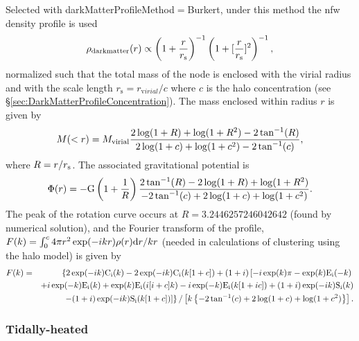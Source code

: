 Selected with {\normalfont \ttfamily darkMatterProfileMethod}$=${\normalfont \ttfamily Burkert}, under this method the \gls{nfw} density profile \citep{burkert_structure_1995} is used
\begin{equation}
  \rho_{\rm dark matter}(r) \propto \left(1+{r\over r_{\mathrm s}}\right)^{-1} \left(1+[{r\over r_{\mathrm s}}]^2\right)^{-1},
\end{equation}
normalized such that the total mass of the \gls{node} is enclosed with the virial radius and with the scale length $r_{\mathrm s} = r_{\mathrm virial}/c$ where $c$ is the halo concentration (see \S\ref{sec:DarkMatterProfileConcentration}). The mass enclosed within radius $r$ is given by
\begin{equation}
M(<r) = M_{\rm virial} {2 \log(1 + R) + \log(1 + R^2) -2 \tan^{-1}(R) \over 2 \log(1 + c) + \log(1 + c^2) -2 \tan^{-1}(c)},
\end{equation}
where $R=r/r_{\rm s}$. The associated gravitational potential is
\begin{equation}
\Phi(r) = -{\rm G} \left(1+{1 \over R}\right) { 2 \tan^{-1}(R) - 2 \log(1 + R) + \log(1 + R^2) \over -2 \tan^{-1}(c) + 2 \log(1 + c) + \log(1 + c^2) }.
\end{equation}
The peak of the rotation curve occurs at $R=3.2446257246042642$ (found by numerical solution), and the Fourier transform of the profile, $F(k) = \int_0^c 4 \pi r^2 \exp(-i k r) \rho(r) {\rm d} r / k r$ (needed in calculations of clustering using the halo model) is given by
\begin{eqnarray}
  F(k) &=& \left\{2 \exp(-i k) {\rm C}_{\rm i}(k) - 2 \exp(-i k) {\rm C}_{\rm i}(k[1 + c]) + (1 + i) \left[-i \exp(k) \pi - \exp(k) {\rm E}_{\rm i}(-k) \right. \right. \nonumber \\
    & & +i \exp(-k) {\rm E}_{\rm i}(k) + \exp(k) {\rm E}_{\rm i}(i [i + c] k) - i \exp(-k) {\rm E}_{\rm i}(k [1 + i c ]) + (1 + i) \exp(-i k) {\rm S}_{\rm i}(k) \nonumber \\
    & & \left. \left. - (1 + i) \exp(-i k) {\rm S}_{\rm i}(k[1 + c])\right]\right\}/\left[k \left\{-2 \tan^{-1}(c) + 2 \log(1 + c) + \log(1 + c^2)\right\}\right].
\end{eqnarray}

\subsubsection{Tidally-heated}\label{phys:darkMatterProfile:darkMatterProfileTidallyHeated}

